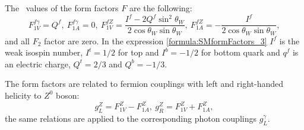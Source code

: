 The \sm\ values of the form factors $F$ are the following:
\begin{equation}
	F^{f\gamma}_{1V} = Q^{f}, \ F^{f\gamma}_{1A} = 0, \ F^{fZ}_{1V} = \frac{I^f - 2Q^f\sin^2\theta_W}{2\cos\theta_W\sin\theta_W}, \ F^{fZ}_{1A} = - \frac{I^f}{2\cos\theta_W\sin\theta_W},
    \label{formula:SMformFactors_3}
\end{equation}
and all $F_2$ factor are zero. In the expression \ref{formula:SMformFactors_3} $I^f$ is the weak isospin number, $I^t = 1/2$ for top and $I^b = -1/2$ for bottom quark and $q^f$ is an electric charge, $Q^t = 2/3$ and $Q^b = -1/3$.

The form factors are related to fermion couplings with left and right-handed helicity to $Z^0$ boson:
\begin{equation}
	g_L^Z = F_{1V}^Z - F_{1A}^Z, \  g_R^Z = F_{1V}^Z + F_{1A}^Z, 
    \label{formula:EWcouplings_3}
\end{equation}
the same relations are applied to the corresponding photon couplings $g^\gamma_L$.

